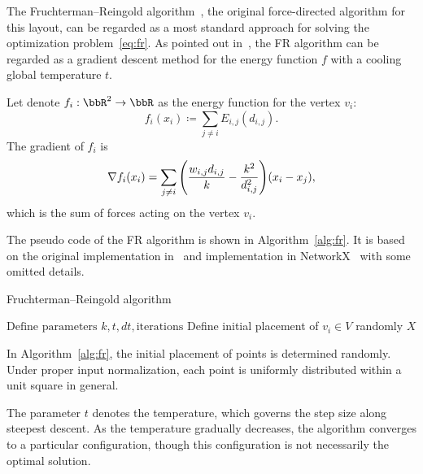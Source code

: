 \documentclass[dvipdfmx,lettersize,journal]{IEEEtran}
\newcommand{\defeq}{\coloneqq}
\begin{document}
The Fruchterman--Reingold algorithm~\cite{fruchtermanGraphDrawingForcedirected1991}, the original force-directed algorithm for this layout, can be regarded as a most standard approach for solving the optimization problem~\eqref{eq:fr}.
As pointed out in~\cite{tunkelang1999numerical}, the FR algorithm can be regarded as a gradient descent method for the energy function $f$ with a cooling global temperature $t$.

Let denote $f_i: \bbR^2 \to \bbR$ as the energy function for the vertex $v_i$:
\begin{equation*}
  f_i(x_i) \defeq \sum_{j \neq i} E_{i,j}(d_{i,j}).
\end{equation*}
The gradient of $f_i$ is
\begin{equation}\label{eq:gradientFi}
  \nabla f_i(x_i) = \sum_{j \neq i} \qty(\frac{w_{i,j}d_{i,j}}{k} - \frac{k^2}{d_{i,j}^2}) (x_i-x_j),
\end{equation}
which is the sum of forces acting on the vertex $v_i$.

The pseudo code of the FR algorithm is shown in Algorithm~\ref{alg:fr}. It is based on the original implementation in~\cite{fruchtermanGraphDrawingForcedirected1991} and implementation in NetworkX~\cite{osti_960616} with some omitted details.

\begin{algorithm}[ht]
  \caption{Fruchterman--Reingold algorithm}
  \label{alg:fr}

  $\text{Define parameters } k, t, dt, \text{iterations}$\;
  Define initial placement of $v_i \in V$ randomly\;
  \Return $X$\;
\end{algorithm}

In Algorithm~\ref{alg:fr}, the initial placement of points is determined randomly. Under proper input normalization, each point is uniformly distributed within a unit square in general.

The parameter $t$ denotes the temperature, which governs the step size along steepest descent. As the temperature gradually decreases, the algorithm converges to a particular configuration, though this configuration is not necessarily the optimal solution.
\end{document}
